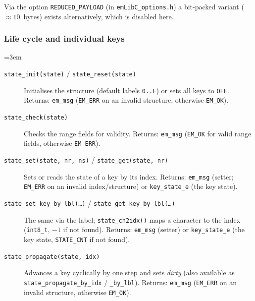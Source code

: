 \noindent Via the option \verb|REDUCED_PAYLOAD| (in \verb|emLibC_options.h|) a
bit-packed variant ($\approx 10$~bytes) exists alternatively, which is
disabled here.

\subsubsection*{Life cycle and individual keys}
{\sloppy\emergencystretch=3em
\begin{description}
\item[\texttt{state\_init(state)} / \texttt{state\_reset(state)}] Initialises
  the structure (default labels \verb|0..F|) or sets all keys to \verb|OFF|.
  Returns: \verb|em_msg| (\verb|EM_ERR| on an invalid structure, otherwise
  \verb|EM_OK|).
\item[\texttt{state\_check(state)}] Checks the range fields for validity.
  Returns: \verb|em_msg| (\verb|EM_OK| for valid range fields, otherwise
  \verb|EM_ERR|).
\item[\texttt{state\_set(state, nr, ns)} / \texttt{state\_get(state, nr)}]
  Sets or reads the state of a key by its index. Returns: \verb|em_msg|
  (setter; \verb|EM_ERR| on an invalid index/structure) or \verb|key_state_e|
  (the key state).
\item[\texttt{state\_set\_key\_by\_lbl(\dots)} /
  \texttt{state\_get\_key\_by\_lbl(\dots)}] The same via the label;
  \verb|state_ch2idx()| maps a character to the index (\verb|int8_t|, $-1$ if
  not found). Returns: \verb|em_msg| (setter) or \verb|key_state_e| (the key
  state, \verb|STATE_CNT| if not found).
\item[\texttt{state\_propagate(state, idx)}] Advances a key cyclically by one
  step and sets \emph{dirty} (also available as \verb|state_propagate_by_idx|
  / \verb|_by_lbl|). Returns: \verb|em_msg| (\verb|EM_ERR| on an invalid
  structure, otherwise \verb|EM_OK|).
\end{description}
\par}

